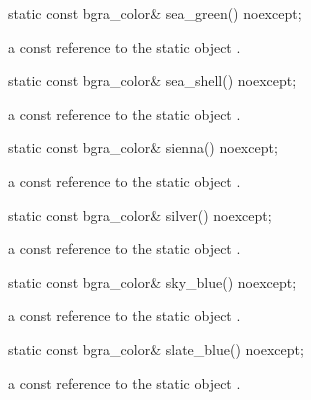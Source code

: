 \begin{itemdecl}
static const bgra_color& sea_green() noexcept;
\end{itemdecl}
\begin{itemdescr}
\pnum
\returns
a const reference to the static  object .
\end{itemdescr}

\begin{itemdecl}
static const bgra_color& sea_shell() noexcept;
\end{itemdecl}
\begin{itemdescr}
\pnum
\returns
a const reference to the static  object .
\end{itemdescr}

\begin{itemdecl}
static const bgra_color& sienna() noexcept;
\end{itemdecl}
\begin{itemdescr}
\pnum
\returns
a const reference to the static  object .
\end{itemdescr}

\begin{itemdecl}
static const bgra_color& silver() noexcept;
\end{itemdecl}
\begin{itemdescr}
\pnum
\returns
a const reference to the static  object .
\end{itemdescr}

\begin{itemdecl}
static const bgra_color& sky_blue() noexcept;
\end{itemdecl}
\begin{itemdescr}
\pnum
\returns
a const reference to the static  object .
\end{itemdescr}

\begin{itemdecl}
static const bgra_color& slate_blue() noexcept;
\end{itemdecl}
\begin{itemdescr}
\pnum
\returns
a const reference to the static  object .
\end{itemdescr}

